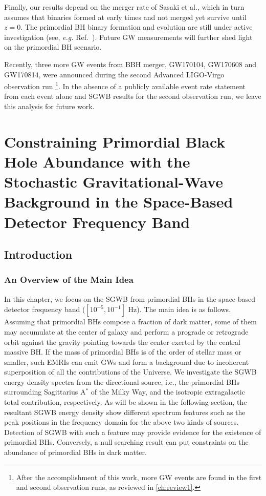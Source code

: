 Finally, our results depend on the merger rate of Sasaki et al., which in turn assumes that binaries formed at early times and not merged yet survive until $z=0$. 
The primordial \ac{BH} binary formation and evolution are still under active investigation (see, \textit{e.g.} Ref.~\cite{Hayasaki:2009ug,Eroshenko:2016hmn,Ali-Haimoud:2017rtz}).
Future \ac{GW} measurements will further shed light on the primordial \ac{BH} scenario.

Recently, three more \ac{GW} events from \ac{BBH} merger, GW170104, GW170608 and GW170814, were announced during the second Advanced LIGO-Virgo observation run \cite{PhysRevLett.118.221101,Abbott:2017gyy,PhysRevLett.119.141101} \footnote{After the accomplishment of this work, more \ac{GW} events are found in the first and second observation runs, as reviewed in \cref{ch:review1}.}.
In the absence of a publicly available event rate statement from each event alone and \ac{SGWB} results for the second observation run, we leave this analysis for future work.

\chapterend

\chapter{Constraining Primordial Black Hole Abundance with the Stochastic Gravitational-Wave Background in the Space-Based Detector Frequency Band}\label{chap:SGWBspace}

\section{Introduction} 

\subsection{An Overview of the Main Idea}
In this chapter, we focus on the \ac{SGWB} from primordial \acp{BH} in the space-based detector frequency band ($[10^{-5}, 10^{-1}]$ Hz).
The main idea is as follows.
Assuming that primordial \acp{BH} compose a fraction of dark matter, some of them may accumulate  at the center of galaxy and perform a prograde or retrograde orbit against the gravity pointing towards the center exerted by the central massive \ac{BH}.
If the mass of primordial \acp{BH} is of the order of stellar mass or smaller, such \acp{EMRI} can emit \acp{GW} and form a background due to incoherent superposition of all the contributions of the Universe. 
We investigate the \ac{SGWB} energy density spectra from the directional source, i.e., the primordial \acp{BH} surrounding Sagittarius A$^\ast$ of the Milky Way, and the isotropic extragalactic total contribution, respectively.
As will be shown in the following section, the resultant \ac{SGWB} energy density show different spectrum features such as the peak positions in the frequency domain for the above two kinds of sources.
Detection of \ac{SGWB} with such a feature may provide evidence for the existence of primordial \acp{BH}. 
Conversely, a null searching result can put constraints on the abundance of primordial \acp{BH} in dark matter.

